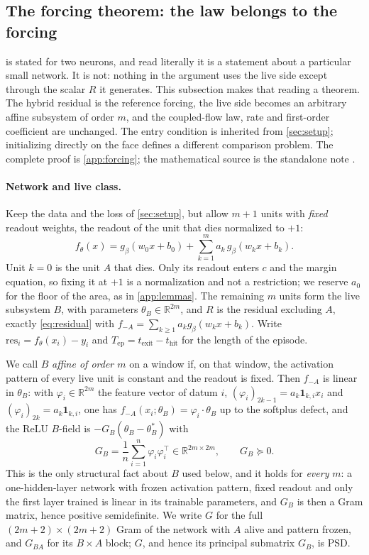 \documentclass[11pt]{article}
\theoremstyle{definition}
\theoremstyle{remark}
\newcommand{\R}{\mathbb{R}}
\newcommand{\thit}{t_{\mathrm{hit}}}
\newcommand{\texit}{t_{\mathrm{exit}}}
\newcommand{\Tep}{T_{\mathrm{ep}}}   %
\newcommand{\res}{\mathrm{res}}
\begin{document}
\subsection{The forcing theorem: the law belongs to the
forcing}\label{sec:forcing}

 is stated for two neurons, and read literally it is a statement
about a particular small network. It is not: nothing in the argument uses the
live side except through the scalar $R$ it generates. This subsection makes that
reading a theorem. The hybrid residual is the reference forcing, the live
side becomes an arbitrary affine subsystem of order $m$, and the coupled-flow
law, rate and first-order coefficient are unchanged. The entry condition is
inherited from \cref{sec:setup}; initializing directly on the face defines a
different comparison problem. The complete proof is
\cref{app:forcing}; the mathematical source is the standalone note
.

\paragraph{Network and live class.} Keep the data and the loss of
\cref{sec:setup}, but allow $m+1$ units with \emph{fixed} readout weights, the
readout of the unit that dies normalized to $+1$:
\begin{equation}\label{eq:netF}
f_\theta(x)=g_\beta(w_0x+b_0)+\sum_{k=1}^{m}a_k\,g_\beta(w_kx+b_k) .
\end{equation}
Unit $k=0$ is the unit $A$ that dies. Only its readout enters $c$ and the margin
equation, so fixing it at $+1$ is a normalization and not a restriction; we
reserve $a_0$ for the floor of the area, as in \cref{app:lemmas}. The
remaining $m$ units form the live subsystem $B$, with parameters
$\theta_B\in\R^{2m}$, and $R$ is the residual excluding $A$, exactly
\eqref{eq:residual} with $f_{-A}=\sum_{k\ge1}a_kg_\beta(w_kx+b_k)$. Write
$\res_i=f_\theta(x_i)-y_i$ and $\Tep=\texit-\thit$ for the length of the
episode.

We call $B$ \emph{affine of order $m$} on a window if, on that window, the
activation pattern of every live unit is constant and the readout is fixed. Then
$f_{-A}$ is linear in $\theta_B$: with $\varphi_i\in\R^{2m}$ the feature vector
of datum $i$, $(\varphi_i)_{2k-1}=a_k\mathbf 1_{k,i}x_i$ and
$(\varphi_i)_{2k}=a_k\mathbf 1_{k,i}$, one has
$f_{-A}(x_i;\theta_B)=\varphi_i\cdot\theta_B$ up to the softplus defect, and the
ReLU $B$-field is $-G_B(\theta_B-\theta_B^\ast)$ with
\begin{equation}\label{eq:gramF}
G_B=\frac1n\sum_{i=1}^n\varphi_i\varphi_i^{\!\top}\in\R^{2m\times2m},
\qquad G_B\succeq0 .
\end{equation}
This is the only structural fact about $B$ used below, and it holds for
\emph{every} $m$: a one-hidden-layer network with frozen activation pattern,
fixed readout and only the first layer trained is linear in its trainable
parameters, and $G_B$ is then a Gram matrix, hence positive semidefinite. We
write $G$ for the full $(2m+2)\times(2m+2)$ Gram of the network with $A$ alive
and pattern frozen, and $G_{BA}$ for its $B\times A$ block; $G$, and hence its
principal submatrix $G_B$, is PSD.
\end{document}

